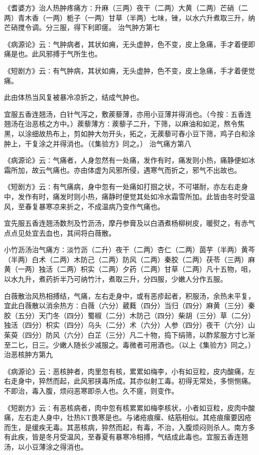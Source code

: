 \documentclass[a4paper,12pt,UTF8,twoside]{ctexbook}
\begin{document}
《耆婆方》治人热肿疼痛方∶升麻（三两）夜干（二两）大黄（二两）芒硝（二两）青木香（一两）栀子（一两）甘草（半两）七味，锉，以水六升煮取三升，纳芒硝搅令调。分三服，得下利即瘥。
治气肿方第七

《病源论》云∶气肿病者，其状如痈，无头虚肿，色不变，皮上急痛，手才着便即痛是也。此风邪搏于气所生也。

《短剧方》云∶有气肿病，其状如痈，无头虚肿，色不变，皮上急痛，手才着便觉痛。

此由体热当风复被暴冷凉折之，结成气肿也。

宜服五香连翘汤，白针气泻之，敷蒺藜薄，亦用小豆薄并得消也。（今按∶五香连翘汤在治恶核之方中。）蒺藜薄方∶蒺藜子二升，下筛，以麻油和如泥，熬令焦黑，以涂细故热布上，剪如肿大勿开头，拓之，无蒺藜可舂小豆下筛，鸡子白和涂肿上，干复涂之并得消也。（《集验方》同之。）
治气痛方第八

《病源论》云∶气痛者，人身忽然有一处痛，发作有时，痛发则小热，痛静便如冰霜所加，故云气痛也。亦由体虚为风邪所侵，遇寒气而折之，邪气不出故也。

《短剧方》云∶有气痛病，身中忽有一处痛如打掴之状，不可堪耐，亦左右走身中，发作有时，痛发时则小热，痛静时便觉其处如冷水霜雪所加。此皆由冬时受温风，至春复暴寒凉来折之，不成温病乃变作气痛也。

宜先服五香连翘汤数剂及竹沥汤，摩丹参膏及以白酒煮杨柳树皮，暖熨之，有赤气点点见处宜去血也，其间将白薇散。

小竹沥汤治气痛方∶淡竹沥（二升）夜干（二两）杏仁（二两）茵芋（半两）黄芩（半两）白术（二两）木防己（二两）防风（二两）秦胶（二两）茯苓（三两）麻黄（一两）独活（二两）枳实（二两）夕药（二两）甘草（二两）凡十五物，咀，以水九升，煮药折半乃可纳竹汁，煮取三升，分四服，少嫩人分作五服。

白薇散治风热相搏结，气痛，左右走身中，或有恶疹起者，积服汤，余热未平复，宜此白薇散以消余热方∶白薇（六分）葳蕤（四分）当归（四分）麻黄（三分）秦胶（五分）天门冬（四分）蜀椒（二分）木防己（四分）柴胡（三分）草（二分）独活（四分）枳实（四分）乌头（二分）术（六分）人参（四分）夜干（六分）山茱萸（四分）防风（六分）白芷（三分）凡二十物，捣下绢筛，以酢浆服方寸匕渐至二匕，日三。少嫩人随长少减服之。毒微者可用酒也。（以上《集验方》同之。）
治恶核肿方第九

《病源论》云∶恶核肿者，肉里忽有核，累累如梅李，小有如豆粒，皮内酸痛，左右走身中，猝然而起，此风邪挟毒所成。其亦似射工毒。初得无常处，多恻恻痛。不即治，毒入腹，烦闷恶寒即杀人也。久不瘥，则变作。

《短剧方》云∶有恶核病者，肉中忽有核累累如梅李核状，小者如豆粒，皮肉中酸痛，左右走人身中，壮热KT畏寒是也。与诸疮痕瘰、结筋相似。其疮痕瘰要因疮而生，是缓疾无毒。其恶核病，猝然而起，有毒，不治，入腹烦闷则杀人。南方多有此疾，皆是冬月受温风，至春夏有暴寒冷相搏，气结成此毒也。宜服五香连翘汤，以小豆薄涂之得消也。
\end{document}
